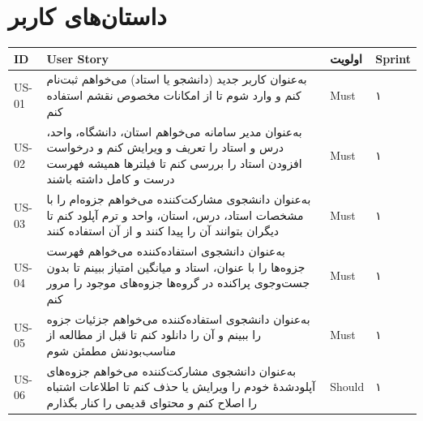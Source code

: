 \documentclass[12pt, a4paper]{article}
\begin{document}
\section{داستان‌های کاربر}

{\def\LTcaptype{none} %
\begin{longtable}[]{@{}
  >{\raggedright\arraybackslash}p{}
  >{\raggedright\arraybackslash}p{}
  >{\raggedright\arraybackslash}p{}
  >{\raggedright\arraybackslash}p{}@{}}
\toprule\noalign{}
\begin{minipage}[b]{\linewidth}\raggedright
ID
\end{minipage} & \begin{minipage}[b]{\linewidth}\raggedright
User Story
\end{minipage} & \begin{minipage}[b]{\linewidth}\raggedright
اولویت
\end{minipage} & \begin{minipage}[b]{\linewidth}\raggedright
Sprint
\end{minipage} \\
\midrule\noalign{}
\endhead
\bottomrule\noalign{}
\endlastfoot
US-01 & به‌عنوان کاربر جدید (دانشجو یا استاد) می‌خواهم ثبت‌نام کنم و وارد شوم تا از امکانات مخصوص نقشم استفاده کنم & Must & ۱ \\
US-02 & به‌عنوان مدیر سامانه می‌خواهم استان، دانشگاه، واحد، درس و استاد را تعریف و ویرایش کنم و درخواست افزودن استاد را بررسی کنم تا فیلترها همیشه فهرست درست و کامل داشته باشند & Must & ۱ \\
US-03 & به‌عنوان دانشجوی مشارکت‌کننده می‌خواهم جزوه‌ام را با مشخصات استاد، درس، استان، واحد و ترم آپلود کنم تا دیگران بتوانند آن را پیدا کنند و از آن استفاده کنند & Must & ۱ \\
US-04 & به‌عنوان دانشجوی استفاده‌کننده می‌خواهم فهرست جزوه‌ها را با عنوان، استاد و میانگین امتیاز ببینم تا بدون جست‌وجوی پراکنده در گروه‌ها جزوه‌های موجود را مرور کنم & Must & ۱ \\
US-05 & به‌عنوان دانشجوی استفاده‌کننده می‌خواهم جزئیات جزوه را ببینم و آن را دانلود کنم تا قبل از مطالعه از مناسب‌بودنش مطمئن شوم & Must & ۱ \\
US-06 & به‌عنوان دانشجوی مشارکت‌کننده می‌خواهم جزوه‌های آپلودشدهٔ خودم را ویرایش یا حذف کنم تا اطلاعات اشتباه را اصلاح کنم و محتوای قدیمی را کنار بگذارم & Should & ۱ \\

\end{longtable}}
\end{document}
